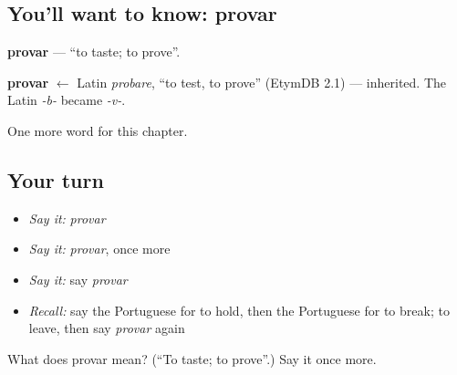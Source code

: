 \subsection*{You'll want to know: provar}
\textbf{provar} — \textquotedblleft{}to taste; to prove\textquotedblright{}.

\begin{cousinweb}
\textbf{provar} $\leftarrow$ Latin \emph{probare}, \textquotedblleft{}to test, to prove\textquotedblright{} (EtymDB 2.1) — inherited. The Latin \emph{-b-} became \emph{-v-}.
\end{cousinweb}

\begin{grammarlens}[title={What you've built}]
One more word for this chapter.
\end{grammarlens}

\subsection*{Your turn}
\begin{itemize}
\raggedright
  \item \emph{Say it:} \emph{provar}
  \item \emph{Say it:} \emph{provar}, once more
  \item \emph{Say it:} say \emph{provar}
  \item \emph{Recall:} say the Portuguese for to hold, then the Portuguese for to break; to leave, then say \emph{provar} again
\end{itemize}

\begin{tcolorbox}[breakable,colback=teal!4,colframe=teal!35!black,title={Before you move on}]
What does provar mean? (\textquotedblleft{}To taste; to prove\textquotedblright{}.) Say it once more.
\end{tcolorbox}
